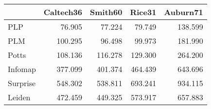 \begin{tabular}{lrrrr}
\toprule
{} & Caltech36 & Smith60 &  Rice31 & Auburn71 \\
\midrule
PLP      &    76.905 &  77.224 &  79.749 &  138.599 \\
PLM      &   100.295 &  96.498 &  99.973 &  181.990 \\
Potts    &   108.136 & 116.278 & 129.300 &  264.200 \\
Infomap  &   377.099 & 401.374 & 464.439 &  643.696 \\
Surprise &   548.302 & 538.811 & 693.241 &  934.115 \\
Leiden   &   472.459 & 449.325 & 573.917 &  657.883 \\
\bottomrule
\end{tabular}

